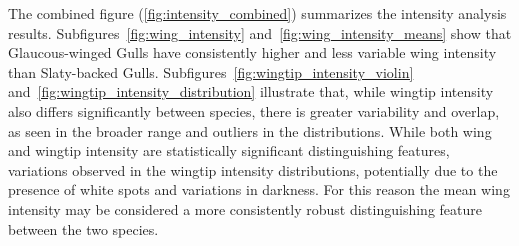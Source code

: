 \documentclass[a4paper,12pt]{report}
\begin{document}
The combined figure (\autoref{fig:intensity_combined}) summarizes the intensity analysis results. Subfigures~\ref{fig:wing_intensity} and~\ref{fig:wing_intensity_means} show that Glaucous-winged Gulls have consistently higher and less variable wing intensity than Slaty-backed Gulls. Subfigures~\ref{fig:wingtip_intensity_violin} and~\ref{fig:wingtip_intensity_distribution} illustrate that, while wingtip intensity also differs significantly between species, there is greater variability and overlap, as seen in the broader range and outliers in the distributions.
While both wing and wingtip intensity are statistically significant distinguishing features, variations observed in the wingtip intensity distributions, potentially due to the presence of white spots and variations in darkness. For this reason the mean wing intensity may be considered a more consistently robust distinguishing feature between the two species.
\end{document}

